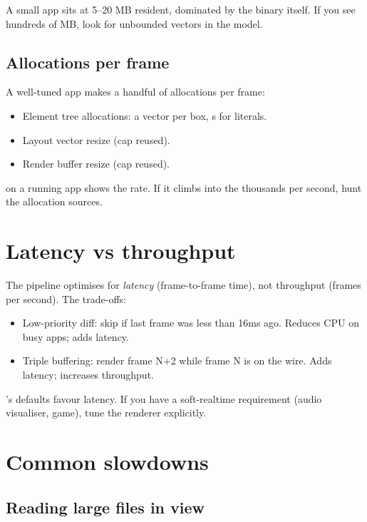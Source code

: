 A small \maya{} app sits at 5--20 MB resident, dominated by the
binary itself. If you see hundreds of MB, look for unbounded
vectors in the model.

\subsection*{Allocations per frame}

A well-tuned app makes a handful of allocations per frame:

\begin{itemize}[leftmargin=*]
  \item Element tree allocations: a vector per box,
    s for literals.
  \item Layout vector resize (cap reused).
  \item Render buffer resize (cap reused).
\end{itemize}

 on a running app shows the rate.
If it climbs into the thousands per second, hunt the
allocation sources.

\section{Latency vs throughput}

The pipeline optimises for \emph{latency} (frame-to-frame
time), not throughput (frames per second). The trade-offs:

\begin{itemize}[leftmargin=*]
  \item Low-priority diff: skip if last frame was less than
    16ms ago. Reduces CPU on busy apps; adds latency.
  \item Triple buffering: render frame N+2 while frame N is on
    the wire. Adds latency; increases throughput.
\end{itemize}

\maya{}'s defaults favour latency. If you have a soft-realtime
requirement (audio visualiser, game), tune the renderer
explicitly.

\section{Common slowdowns}

\subsection*{Reading large files in view}

